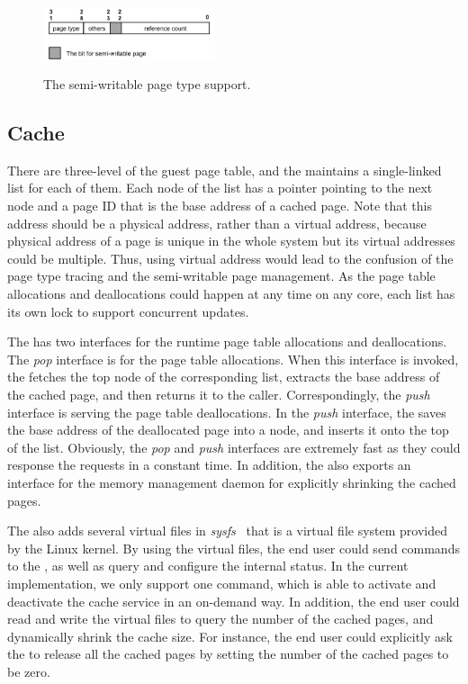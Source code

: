 \begin{figure}[ht]
\centering
\includegraphics[width=0.45\textwidth]{image/implementation/field-of-semi-type.jpg} \\
\caption{The semi-writable page type support.}
\label{fig:field-of-semi-type}
\end{figure}

\subsection{\name Cache}
There are three-level of the guest page table, and the \cache maintains a single-linked list for each of them.
Each node of the list has a pointer pointing to the next node and a page ID that is the base address of a cached page.
Note that this address should be a physical address, rather than a virtual address, because physical address of a page is unique in the whole system but its virtual addresses could be multiple.
Thus, using virtual address would lead to the confusion of the page type tracing and the semi-writable page management.
As the page table allocations and deallocations could happen at any time on any core, each list has its own lock to support concurrent updates.

The \cache has two interfaces for the runtime page table allocations and deallocations.
The \emph{pop} interface is for the page table allocations.
When this interface is invoked, the \cache fetches the top node of the corresponding list, extracts the base address of the cached page, and then returns it to the caller.
Correspondingly, the \emph{push} interface is serving the page table deallocations.
In the \emph{push} interface, the \cache saves the base address of the deallocated page into a node, and inserts it onto the top of the list.
Obviously, the \emph{pop} and \emph{push} interfaces are extremely fast as they could response the requests in a constant time.
In addition, the \cache also exports an interface for the memory management daemon for explicitly shrinking the cached pages.

The \cache also adds several virtual files in \emph{sysfs}~\cite{love2004linux,mochel2005sysfs} that is a virtual file system provided by the Linux kernel.
By using the virtual files, the end user could send commands to the \cache,  as well as query and configure the internal status.
In the current implementation, we only support one command, which is able to activate and deactivate the cache service in an on-demand way.
In addition, the end user could read and write the virtual files to query the number of the cached pages, and dynamically shrink the cache size.
For instance, the end user could explicitly ask the \cache to release all the cached pages by setting the number of the cached pages to be zero.

